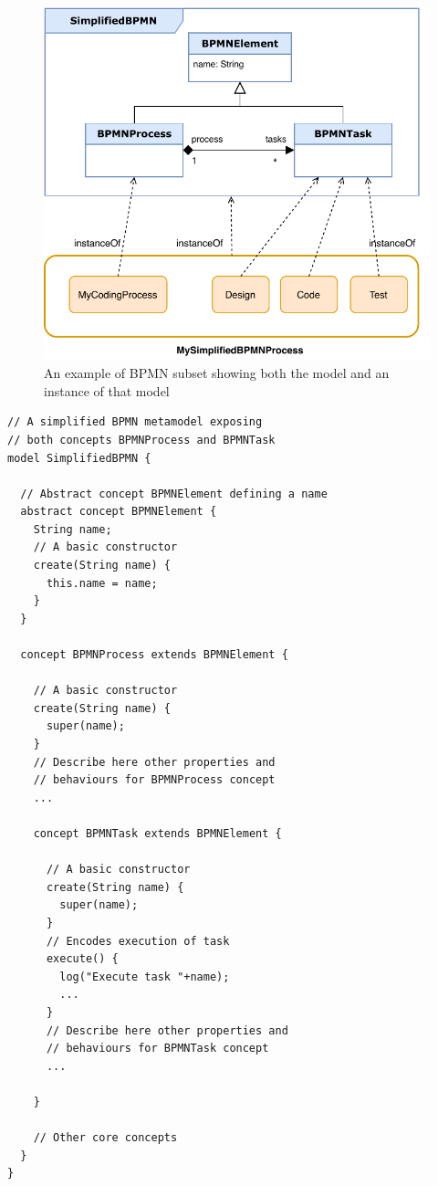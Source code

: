 \begin{figure}[t]
    \centering
    \includegraphics[width=\columnwidth]{Figures/BPMNSubsetExample.pdf}
    \caption{An example of BPMN subset showing both the model and an instance of that model}
    \label{fig:BPMNSubsetExample}
\end{figure}

\begin{lstlisting}
// A simplified BPMN metamodel exposing
// both concepts BPMNProcess and BPMNTask
model SimplifiedBPMN {

  // Abstract concept BPMNElement defining a name
  abstract concept BPMNElement {
    String name;
    // A basic constructor
    create(String name) {
      this.name = name;
    }
  }

  concept BPMNProcess extends BPMNElement {

    // A basic constructor
    create(String name) {
      super(name);
    }
    // Describe here other properties and
    // behaviours for BPMNProcess concept
    ...

    concept BPMNTask extends BPMNElement {

      // A basic constructor
      create(String name) {
        super(name);
      }
      // Encodes execution of task
      execute() {
        log("Execute task "+name);
        ...
      }
      // Describe here other properties and
      // behaviours for BPMNTask concept
      ...

    }

    // Other core concepts
  }
}
\end{lstlisting}


